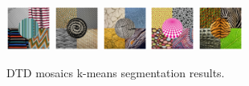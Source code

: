 \documentclass[journal]{IEEEtran}
\begin{document}
\begin{figure}[!t]
\centering
\includegraphics[width=0.13\textwidth]{mosaic_dtd1}\hfil
\includegraphics[width=0.13\textwidth]{mosaic_dtd2}\hfil
\includegraphics[width=0.13\textwidth]{mosaic_dtd3}\hfil
\includegraphics[width=0.13\textwidth]{mosaic_dtd4}\hfil
\includegraphics[width=0.13\textwidth]{mosaic_dtd5}\\[2ex]
\hfil
{}\hfil
{}\hfil
{}\hfil
{}
\caption{DTD mosaics k-means segmentation results.}\label{fig:kmeans_segms_dtd_mosaics}    
\end{figure}
\end{document}
